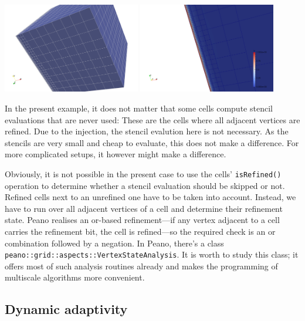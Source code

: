 \begin{center}
 \includegraphics[width=0.45\textwidth]{41_heat-equation/initial-adaptive-grid.png}
 \includegraphics[width=0.45\textwidth]{41_heat-equation/adaptive-grid-21.png}
\end{center}


\noindent
In the present example, it does not matter that some cells compute stencil
evaluations that are never used:
These are the cells where all adjacent vertices are refined.
Due to the injection, the stencil evalution here is not necessary.
As the stencils are very small and cheap to evaluate, this does not make a
difference.
For more complicated setups, it however might make a difference.

Obviously, it is not possible in the present case to use the cells'
\texttt{isRefined()} operation to determine whether a stencil evaluation should
be skipped or not.
Refined cells next to an unrefined one have to be taken into account.
Instead, we have to run over all adjacent vertices of a cell and determine their
refinement state.
Peano realises an or-based refinement---if any vertex adjacent to a cell carries
the refinement bit, the cell is refined---so the required check is an or
combination followed by a negation.
In Peano, there's a class \texttt{peano::grid::aspects::VertexStateAnalysis}.
It is worth to study this class; it offers most of such analysis routines
already and makes the programming of multiscale algorithms more convenient.


\subsection{Dynamic adaptivity}

